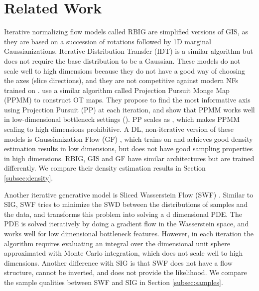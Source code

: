 \documentclass{article}
\begin{document}
\section{Related Work}

\label{sec:related}

Iterative normalizing flow models called 
RBIG \citep{chen2001gaussianization, laparra2011iterative} are simplified versions of GIS, as they are based on a succession of rotations followed by 1D marginal Gaussianizations. Iterative Distribution Transfer (IDT) \citep{pitie2007automated} is a similar algorithm but does not require the base distribution to be a Gaussian. These models do not scale well to high dimensions because they do not have a good way of choosing the axes 
(slice directions), and they are not competitive against modern NFs trained on  \citep{meng2020gaussianization}. 
\citet{meng2019ppmm} use a similar algorithm called Projection Pursuit Monge Map (PPMM) to construct OT maps. They propose to find the most informative axis using Projection Pursuit (PP) \cite{FreedmanPP} at each iteration, and show that PPMM works well in low-dimensional bottleneck settings (). PP scales as , which makes PPMM scaling to high dimensions prohibitive. A DL, non-iterative version of these models is Gaussianization Flow (GF) \cite{meng2020gaussianization}, which trains on  and achieves good density estimation results in low dimensions, but does not have good sampling properties in high dimensions. RBIG, GIS and GF have similar architectures but are trained differently. We compare their density estimation results in Section \ref{subsec:density}.

Another iterative generative model is Sliced Wasserstein Flow (SWF) \citep{liutkus2018sliced}. Similar to SIG, SWF tries to minimize the SWD between the distributions of samples and the data, and transforms this problem into solving a d dimensional PDE. The PDE is solved iteratively by doing a gradient flow in the Wasserstein space, and works well for low dimensional bottleneck features. However, in each iteration the algorithm requires evaluating an integral over the  dimensional unit sphere approximated with Monte Carlo integration, which does not scale well to high dimensions. Another difference with SIG is that SWF does not have a flow structure, cannot be inverted, and does
not provide the likelihood. We compare the sample qualities between SWF and SIG in Section \ref{subsec:samples}.
\end{document}
